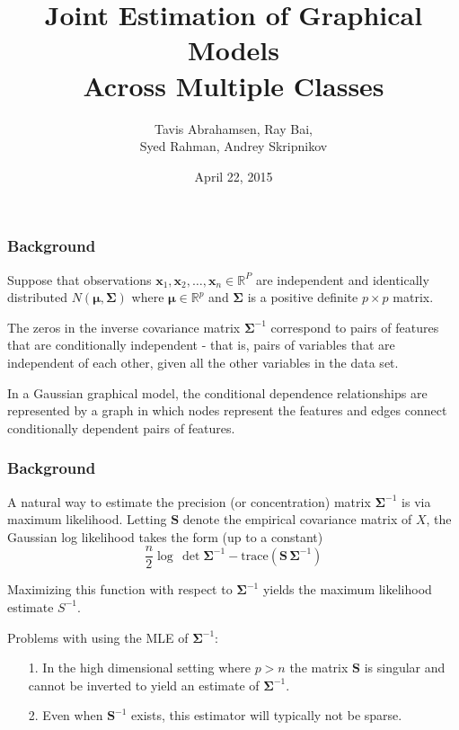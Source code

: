\documentclass[t]{beamer}
\title[The Joint Graphical Lasso]{Joint Estimation of Graphical Models \\ Across Multiple Classes}
\author[Abrahamsen, Bai, Rahman \& Skripnikov]{Tavis Abrahamsen, Ray Bai, \\ Syed Rahman, Andrey Skripnikov}
\institute[ ]{Department of Statistics \\ University of Florida}
\date{April 22, 2015}
\begin{document}
\begin{frame}
 \titlepage
\end{frame}

\begin{frame}
\frametitle{Background}
Suppose that observations $\bm{x}_{1},\bm{x}_{2},\ldots,\bm{x}_{n} \in \mathbb{R}^{P}$ are independent and identically distributed $N(\bm{\mu},\bm{\Sigma})$ where $\bm{\mu} \in \mathbb{R}^{p}$ and $\bm{\Sigma}$ is a positive definite $p\times p$ matrix. 

\bigskip
\pause
The zeros in the inverse covariance matrix $\bm{\Sigma}^{-1}$ correspond to pairs of features that are conditionally independent - that is, pairs of variables that are independent of each other, given all the other variables in the data set.

\bigskip
\pause
In a Gaussian graphical model, the conditional dependence relationships are represented by a graph in which nodes represent the features and edges connect conditionally dependent pairs of features.
\end{frame}


\begin{frame}
\frametitle{Background}
A natural way to estimate the precision (or concentration) matrix $\bm{\Sigma}^{-1}$ is via maximum likelihood.  Letting $\bm{S}$ denote the empirical covariance matrix of $X$, the Gaussian log likelihood takes the form (up to a constant)
\small
\begin{equation*}
\frac{n}{2}\log\, \det \bm{\Sigma}^{-1} - \mbox{trace}\left(\bm{S\,\Sigma}^{-1}\right)
\end{equation*}

\normalsize
\bigskip
\pause
Maximizing this function with respect to $\bm{\Sigma}^{-1}$ yields the maximum likelihood estimate $S^{-1}$.

\bigskip
\pause
Problems with using the MLE of $\bm{\Sigma}^{-1}$:
\begin{itemize}
	\item[1.] In the high dimensional setting where $p > n$ the matrix $\bm{S}$ is singular and cannot be inverted to yield an estimate of $\bm{\Sigma}^{-1}$.
	
	\bigskip
	\item[2.] Even when $\bm{S}^{-1}$ exists, this estimator will typically not be sparse.
\end{itemize}
\end{frame}
\end{document}

